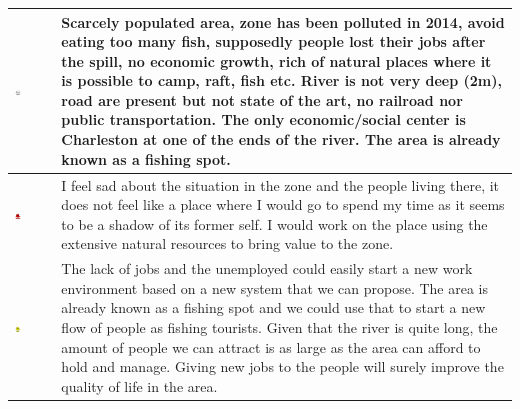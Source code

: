 \begin{center}
\begin{tabular}{ | m{} | m{}| } 
\hline
\includegraphics[width=0.20\textwidth]{Img/White.png} & Scarcely populated area, zone has been polluted in 2014, avoid eating too many fish, supposedly people lost their jobs after the spill, no economic growth, rich of natural places where it is possible to camp, raft, fish etc. \newline River is not very deep (2m), road are present but not state of the art, no railroad nor public transportation. \newline The only economic/social center is Charleston at one of the ends of the river. \newline The area is already known as a fishing spot. \\ 
\hline
\includegraphics[width=0.20\textwidth]{Img/Red.png} & I feel sad about the situation in the zone and the people living there, it does not feel like a place where I would go to spend my time as it seems to be a shadow of its former self. \newline I would work on the place using the extensive natural resources to bring value to the zone. \\  
\hline
\includegraphics[width=0.20\textwidth]{Img/Yellow.png} & The lack of jobs and the unemployed could easily start a new work environment based on a new system that we can propose. \newline The area is already known as a fishing spot and we could use that to start a new flow of people as fishing tourists. \newline Given that the river is quite long, the amount of people we can attract is as large as the area can afford to hold and manage. \newline Giving new jobs to the people will surely improve the quality of life in the area. \\  

\end{tabular}
\end{center}
